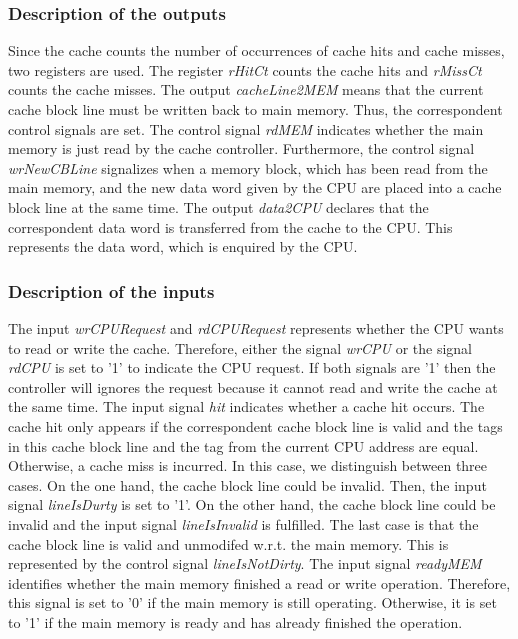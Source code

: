 \subsubsection{Description of the outputs}
Since the cache counts the number of occurrences of cache hits and cache misses, two registers are used. The register \textit{rHitCt} counts the cache hits and \textit{rMissCt} counts the cache misses.
The output \textit{cacheLine2MEM} means that the current cache block line must be written back to main memory. Thus, the correspondent control signals are set. The control signal \textit{rdMEM} indicates whether the main memory is just read by the cache controller. Furthermore, the control signal \textit{wrNewCBLine} signalizes when a memory block, which has been read from the main memory, and the new data word given by the CPU are placed into a cache block line at the same time.
The output \textit{data2CPU} declares that the correspondent data word is transferred from the cache to the CPU. This represents the data word, which is enquired by the CPU.

\subsubsection{Description of the inputs}
The input \textit{wrCPURequest} and \textit{rdCPURequest} represents whether the CPU wants to read or write the cache. Therefore, either the signal \textit{wrCPU} or the signal \textit{rdCPU} is set to '1' to indicate the CPU request. If both signals are '1' then the controller will ignores the request because it cannot read and write the cache at the same time.
The input signal \textit{hit} indicates whether a cache hit occurs. The cache hit only appears if the correspondent cache block line is valid and the tags in this cache block line and the tag from the current CPU address are equal. Otherwise, a cache miss is incurred. In this case, we distinguish between three cases. On the one hand, the cache block line could be invalid. Then, the input signal \textit{lineIsDurty} is set to '1'. On the other hand, the cache block line could be invalid and the input signal \textit{lineIsInvalid} is fulfilled. The last case is that the cache block line is valid and unmodifed w.r.t. the main memory. This is represented by the control signal \textit{lineIsNotDirty}.
The input signal \textit{readyMEM} identifies whether the main memory finished a read or write operation. Therefore, this signal is set to '0' if the main memory is still operating. Otherwise, it is set to '1' if the main memory is ready and has already finished the operation.

